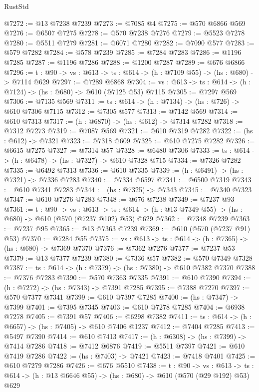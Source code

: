 \begin{lexlean}{RustStd}
\begin{coremodule}
@7272 := @13 @7238 @7239
@7273 := @7085 @4
@7275 := @570 @6866 @569
@7276 := @6507 @7275
@7278 := @570 @7238 @7276
@7279 := @5523 @7278
@7280 := @5511 @7279
@7281 := @6071 @7280
@7282 := @7090 @577
@7283 := @579 @7282
@7284 := @578 @7239
@7285 := @7284 @7283
@7286 := @1196 @7285
@7287 := @1196 @7286
@7288 := @1200 @7287
@7289 := @676 @6866
@7296 := {t : @90} -> {vs : @613} -> {ts : @614} -> (h : @7109 @55) -> (hs : @680) -> @7114 @629
@7297 := @7289 @6868
@7304 := {vs : @613} -> {ts : @614} -> (h : @7124) -> (hs : @680) -> @610 (@7125 @53) @7115
@7305 := @7297 @569
@7306 := @7135 @569
@7311 := {ts : @614} -> (h : @7134) -> (hs : @726) -> @610 @7306 @7115
@7312 := @7305 @577
@7313 := @7142 @569
@7314 := @610 @7313
@7317 := (h : @6870) -> (hs : @612) -> @7314 @7282
@7318 := @7312 @7273
@7319 := @7087 @569
@7321 := @610 @7319 @7282
@7322 := (hs : @612) -> @7321
@7323 := @7318 @609
@7325 := @610 @7275 @7282
@7326 := @6615 @7275
@7327 := @7314 @57
@7328 := @6480 @7306
@7333 := {ts : @614} -> (h : @6478) -> (hs : @7327) -> @610 @7328 @715
@7334 := @7326 @7282
@7335 := @6492 @7313
@7336 := @610 @7335
@7339 := (h : @6491) -> (hs : @7321) -> @7336 @7283
@7340 := @7334 @6597
@7341 := @6500 @7319
@7343 := @610 @7341 @7283
@7344 := (hs : @7325) -> @7343
@7345 := @7340 @7323
@7347 := @610 @7276 @7283
@7348 := @676 @7238
@7349 := @7237 @93
@7361 := {t : @90} ->
  {vs : @613} ->
  {ts : @614} -> (h : @13 @7349 @55) -> (hs : @680) -> @610 (@570 (@7237 @102) @53) @629
@7362 := @7348 @7239
@7363 := @7237 @95
@7365 := @13 @7363 @7239
@7369 := @610 (@570 (@7237 @91) @53)
@7370 := @7284 @55
@7375 := {vs : @613} -> {ts : @614} -> (h : @7365) -> (hs : @680) -> @7369 @7370
@7376 := @7362 @7276
@7377 := @7237 @53
@7379 := @13 @7377 @7239
@7380 := @7336 @57
@7382 := @570 @7349 @7328
@7387 := {ts : @614} -> (h : @7379) -> (hs : @7380) -> @610 @7382 @7370
@7388 := @7376 @7283
@7390 := @570 @7363 @7335
@7391 := @610 @7390
@7394 := (h : @7272) -> (hs : @7343) -> @7391 @7285
@7395 := @7388 @7270
@7397 := @570 @7377 @7341
@7399 := @610 @7397 @7285
@7400 := (hs : @7347) -> @7399
@7401 := @7395 @7345
@7403 := @610 @7278 @7285
@7404 := @6938 @7278
@7405 := @7391 @57
@7406 := @6298 @7382
@7411 := {ts : @614} -> (h : @6657) -> (hs : @7405) -> @610 @7406 @1237
@7412 := @7404 @7285
@7413 := @5497 @7390
@7414 := @610 @7413
@7417 := (h : @6308) -> (hs : @7399) -> @7414 @7286
@7418 := @7412 @6876
@7419 := @5511 @7397
@7421 := @610 @7419 @7286
@7422 := (hs : @7403) -> @7421
@7423 := @7418 @7401
@7425 := @610 @7279 @7286
@7426 := @676 @5510
@7438 := {t : @90} ->
  {vs : @613} ->
  {ts : @614} -> (h : @13 @6646 @55) -> (hs : @680) -> @610 (@570 (@29 @192) @53) @629

\end{coremodule}
\end{lexlean}
